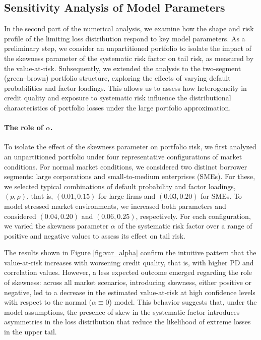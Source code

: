 \documentclass[preprint,12pt]{article}
\begin{document}
\subsection{Sensitivity Analysis of Model Parameters}

In the second part of the numerical analysis, we examine how the shape and risk profile of the limiting loss distribution respond to key model parameters. As a preliminary step, we consider an unpartitioned portfolio to isolate the impact of the skewness parameter of the systematic risk factor on tail risk, as measured by the value-at-risk. Subsequently, we extended the analysis to the two-segment (green–brown) portfolio structure, exploring the effects of varying default probabilities and factor loadings. This allows us to assess how heterogeneity in credit quality and exposure to systematic risk influence the distributional characteristics of portfolio losses under the large portfolio approximation.

\paragraph{The role of $\alpha$.} 
To isolate the effect of the skewness parameter on portfolio risk, we first analyzed an unpartitioned portfolio under four representative configurations of market conditions. For normal market conditions, we considered two distinct borrower segments: large corporations and small-to-medium enterprises (SMEs). For these, we selected typical combinations of default probability and factor loadings, $(p, \rho)$, that is, $(0.01, 0.15)$ for large firms and $(0.03, 0.20)$ for SMEs. To model stressed market environments, we increased both parameters and considered $(0.04, 0.20)$ and $(0.06, 0.25)$, respectively. For each configuration, we varied the skewness parameter $\alpha$ of the systematic risk factor over a range of positive and negative values to assess its effect on tail risk.

The results shown in Figure \ref{fig:var_alpha} confirm the intuitive pattern that the value-at-risk increases with worsening credit quality, that is, with higher PD and correlation values. However, a less expected outcome emerged regarding the role of skewness: across all market scenarios, introducing skewness, either positive or negative, led to a decrease in the estimated value-at-risk at high confidence levels with respect to the normal ($\alpha\equiv 0$) model. This behavior suggests that, under the model assumptions, the presence of skew in the systematic factor introduces asymmetries in the loss distribution that reduce the likelihood of extreme losses in the upper tail. 
\end{document}
